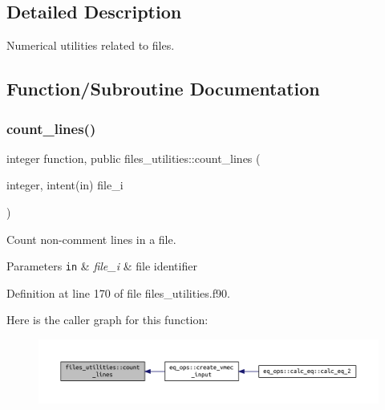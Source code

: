 \subsection{Detailed Description}
Numerical utilities related to files. 

\subsection{Function/\+Subroutine Documentation}
\mbox{\label{namespacefiles__utilities_a3ec80c9937d23aba0d8da951ea292a83}} 
\subsubsection{\texorpdfstring{count\+\_\+lines()}{count\_lines()}}
{\footnotesize\ttfamily integer function, public files\+\_\+utilities\+::count\+\_\+lines (\begin{DoxyParamCaption}\item[{integer, intent(in)}]{file\+\_\+i }\end{DoxyParamCaption})}



Count non-\/comment lines in a file. 


\begin{DoxyParams}[1]{Parameters}
\mbox{\tt in}  & {\em file\+\_\+i} & file identifier \\
\hline
\end{DoxyParams}


Definition at line 170 of file files\+\_\+utilities.\+f90.

Here is the caller graph for this function\+:\nopagebreak
\begin{figure}[H]
\begin{center}
\leavevmode
\includegraphics[width=350pt]{namespacefiles__utilities_a3ec80c9937d23aba0d8da951ea292a83_icgraph}
\end{center}
\end{figure}
\mbox{\label{namespacefiles__utilities_a083c08dfd3919fa2a1df01507fe431af}} 
